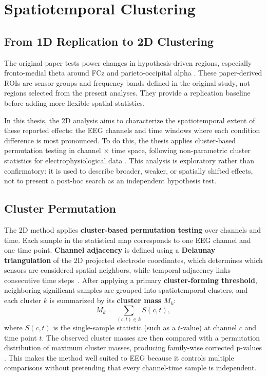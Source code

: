 \documentclass[11pt,a4paper,chapterprefix=false,parskip=false]{scrreprt}
\begin{document}
\chapter{Spatiotemporal Clustering}
\label{chap:clustering}

\section{From 1D Replication to 2D Clustering}
The original paper tests power changes in hypothesis-driven regions, especially fronto-medial theta around FCz and parieto-occipital alpha \citep{drew_conflict_2022, drew_binocular_2026}. These paper-derived ROIs are sensor groups and frequency bands defined in the original study, not regions selected from the present analyses. They provide a replication baseline before adding more flexible spatial statistics.

In this thesis, the 2D analysis aims to characterize the spatiotemporal extent of these reported effects: the EEG channels and time windows where each condition difference is most pronounced. To do this, the thesis applies cluster-based permutation testing in channel $\times$ time space, following non-parametric cluster statistics for electrophysiological data \citep{maris_nonparametric_2007}. This analysis is exploratory rather than confirmatory: it is used to describe broader, weaker, or spatially shifted effects, not to present a post-hoc search as an independent hypothesis test.

\section{Cluster Permutation}
The 2D method applies \textbf{cluster-based permutation testing} over channels and time. Each sample in the statistical map corresponds to one EEG channel and one time point. \textbf{Channel adjacency} is defined using a \textbf{Delaunay triangulation} of the 2D projected electrode coordinates, which determines which sensors are considered spatial neighbors, while temporal adjacency links consecutive time steps~\cite{maris_nonparametric_2007}. After applying a primary \textbf{cluster-forming threshold}, neighboring significant samples are grouped into spatiotemporal clusters, and each cluster $k$ is summarized by its \textbf{cluster mass} $M_k$:
\begin{equation}
    M_k = \sum_{(c,t) \in k} S(c,t),
\end{equation}
where $S(c,t)$ is the single-sample statistic (such as a $t$-value) at channel $c$ and time point $t$. The observed cluster masses are then compared with a permutation distribution of maximum cluster masses, producing family-wise corrected p-values \citep{maris_nonparametric_2007}. This makes the method well suited to EEG because it controls multiple comparisons without pretending that every channel-time sample is independent.
\end{document}
